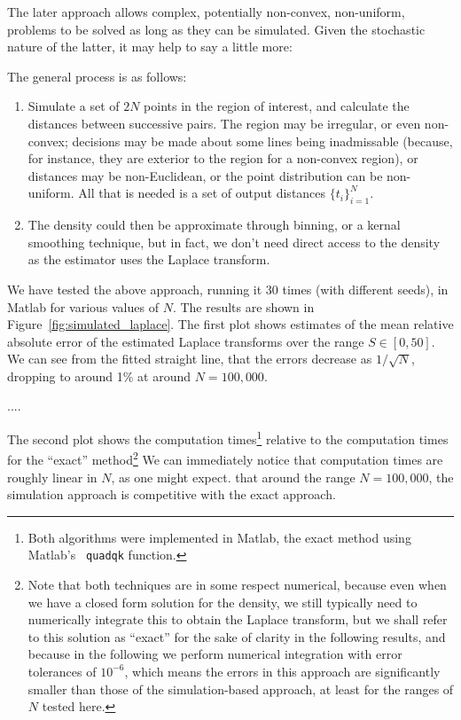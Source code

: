 \documentclass{article}
\begin{document}
The later approach allows complex, potentially non-convex,
non-uniform, problems to be solved as long as they can be
simulated. Given the stochastic nature of the latter, it may help to
say a little more:

The general process is as follows:
\begin{enumerate}

\item Simulate a set of $2N$ points in the region of interest, and
  calculate the distances between successive pairs. The region may be
  irregular, or even non-convex; decisions may be made about some
  lines being inadmissable (because, for instance, they are exterior
  to the region for a non-convex region), or distances may be
  non-Euclidean, or the point distribution can be non-uniform. All
  that is needed is a set of output distances $\{ t_i \}_{i=1}^{N}$.

\item The density could then be approximate through binning, or a
  kernal smoothing technique, but in fact, we don't need direct access
  to the density as the estimator uses the Laplace transform.

\end{enumerate}

We have tested the above approach, running it 30 times (with different
seeds), in Matlab for various values of $N$. The results are shown in
Figure~\ref{fig:simulated_laplace}. The first plot shows estimates of
the mean relative absolute error of the estimated Laplace transforms
over the range $S \in [0, 50]$. We can see from the fitted straight
line, that the errors decrease as $1/\sqrt{N}$, dropping to around 1\%
at around $N=100,000$.


....





The second plot shows the computation times\footnote{Both algorithms
  were implemented in Matlab, the exact method using Matlab's {\tt
    quadqk} function. } relative to the computation times for the
``exact'' method\footnote{Note that both techniques are in some
  respect numerical, because even when we have a closed form solution
  for the density, we still typically need to numerically integrate
  this to obtain the Laplace transform, but we shall refer to this
  solution as ``exact'' for the sake of clarity in the following
  results, and because in the following we perform numerical
  integration with error tolerances of $10^{-6}$, which means the
  errors in this approach are significantly smaller than those of the
  simulation-based approach, at least for the ranges of $N$ tested
  here.}  We can immediately notice that computation times are roughly
linear in $N$, as one might expect. that around the range $N=100,000$,
the simulation approach is competitive with the exact approach.
\end{document}
